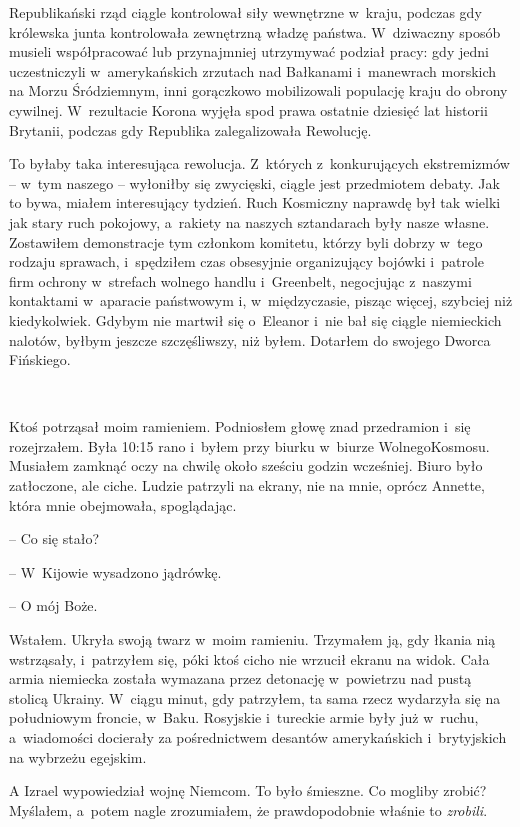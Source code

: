 \documentclass[oneside,polish,11pt,sfheadings]{mwbk}
\begin{document}
Republikański rząd ciągle kontrolował siły wewnętrzne w~kraju, podczas
gdy królewska junta kontrolowała zewnętrzną władzę państwa. W~dziwaczny
sposób musieli współpracować lub przynajmniej utrzymywać podział pracy:
gdy jedni uczestniczyli w~amerykańskich zrzutach nad Bałkanami i~manewrach morskich na Morzu Śródziemnym, inni gorączkowo mobilizowali
populację kraju do obrony cywilnej. W~rezultacie Korona wyjęła spod
prawa ostatnie dziesięć lat historii Brytanii, podczas gdy Republika
zalegalizowała Rewolucję.

To byłaby taka interesująca rewolucja. Z~których z~konkurujących
ekstremizmów -- w~tym naszego -- wyłoniłby się zwycięski, ciągle jest
przedmiotem debaty. Jak to bywa, miałem interesujący tydzień. Ruch
Kosmiczny naprawdę był tak wielki jak stary ruch pokojowy, a~rakiety na
naszych sztandarach były nasze własne. Zostawiłem demonstracje tym
członkom komitetu, którzy byli dobrzy w~tego rodzaju sprawach, i~spędziłem czas obsesyjnie organizujący bojówki i~patrole firm ochrony w~strefach wolnego handlu i~Greenbelt, negocjując z~naszymi kontaktami w~aparacie państwowym i, w~międzyczasie, pisząc więcej, szybciej niż
kiedykolwiek. Gdybym nie martwił się o~Eleanor i~nie bał się ciągle
niemieckich nalotów, byłbym jeszcze szczęśliwszy, niż byłem. Dotarłem do
swojego Dworca Fińskiego.

~

Ktoś potrząsał moim ramieniem. Podniosłem głowę znad przedramion i~się
rozejrzałem. Była 10:15 rano i~byłem przy biurku w~biurze
WolnegoKosmosu. Musiałem zamknąć oczy na chwilę około sześciu godzin
wcześniej. Biuro było zatłoczone, ale ciche. Ludzie patrzyli na ekrany,
nie na mnie, oprócz Annette, która mnie obejmowała, spoglądając.

-- Co się stało?

-- W~Kijowie wysadzono jądrówkę.

-- O mój Boże.

Wstałem. Ukryła swoją twarz w~moim ramieniu. Trzymałem ją, gdy łkania
nią wstrząsały, i~patrzyłem się, póki ktoś cicho nie wrzucił ekranu na
widok. Cała armia niemiecka została wymazana przez detonację w~powietrzu
nad pustą stolicą Ukrainy. W~ciągu minut, gdy patrzyłem, ta sama rzecz
wydarzyła się na południowym froncie, w~Baku. Rosyjskie i~tureckie armie
były już w~ruchu, a~wiadomości docierały za pośrednictwem desantów
amerykańskich i~brytyjskich na wybrzeżu egejskim.

A Izrael wypowiedział wojnę Niemcom. To było śmieszne. Co mogliby
zrobić? Myślałem, a~potem nagle zrozumiałem, że prawdopodobnie właśnie
to \emph{zrobili}.
\end{document}
